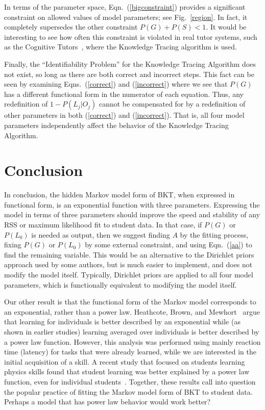 \documentclass{acmlarge-edm}
\begin{document}
In terms of the parameter space, Eqn.~(\ref{bigconstraint})
provides a significant constraint on allowed values of model
parameters; see Fig.~\ref{region}.  In fact, it completely supersedes the
other constraint $P(G)+P(S)<1$.
It would be interesting to see how often this constraint is 
violated in real tutor systems, such as the 
Cognitive Tutors~\cite{ritter_cognitive_2007}, where the Knowledge
Tracing algorithm is used.

Finally, the ``Identifiability Problem'' for the Knowledge Tracing Algorithm
does not exist, so long as there are both correct and incorrect steps.
This fact can be seen by examining Eqns.~(\ref{correct}) and (\ref{incorrect})
where we see that $P(G)$ has a different functional form in
the numerator of each equation.  Thus, any redefinition of $1-P(L_j|O_j)$ 
cannot be compensated for by a redefinition
of other parameters in both  (\ref{correct}) and (\ref{incorrect}).
That is, all four model parameters independently affect the behavior
of the Knowledge Tracing Algorithm.


\section{Conclusion}


In conclusion, the hidden Markov model form of BKT, when expressed
in functional form, is an exponential function with three parameters.
Expressing the model in terms of three parameters should 
improve the speed and stability of any RSS or maximum likelihood 
fit to student data.  In that case, if $P(G)$ or
$P(L_0)$ is needed as output, then we suggest finding $A$ by
the fitting process,  fixing $P(G)$ or $P(L_0)$ by some 
external constraint, and using Eqn.~(\ref{aa}) to find the remaining
variable.
This would be an alternative to the Dirichlet 
priors~\cite{beck_identifiability:_2007} approach used by
some authors, but is much easier to implement, and does not
modify the model itself.  Typically, Dirichlet priors are applied
to all four model parameters, which is functionally equivalent to modifying the model itself.

Our other result is that the functional form of the Markov model 
corresponds to an exponential, rather than a power law.  
Heathcote, Brown, and Mewhort~\citeyear{heathcote_power_2000}
argue that learning for individuals is better described by an
exponential while (as shown in earlier studies) learning averaged
over individuals is better described by a power law function.
However, this analysis was performed using mainly reaction time
(latency) for tasks that were already learned, while we are interested
in the initial acquisition of a skill.  A recent study that focused
on students learning physics skills found that student learning
was better explained by a power law function, even for individual 
students~\cite{chi_instructional_2011}.
Together, these results call into question the popular practice of 
fitting the Markov model form of BKT to student data. 
Perhaps a model that has power law behavior would work better?
\end{document}
